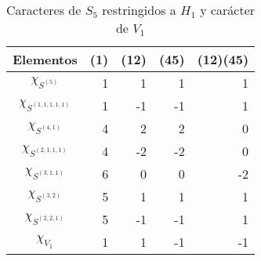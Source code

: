 \documentclass[12pt]{book}
\theoremstyle{definition}
\newcounter{in}
\begin{document}
\begin{table}[!hbtp]
  \centering
  \begin{tabular}{c |r r r r}
    Elementos & (1) & (12) & (45) & (12)(45) \\
    \hline
    $\chi_{S^{(5)}}$ & 1 & 1  & 1  & 1 \\
    $\chi_{S^{(1,1,1,1,1)}}$ & 1 & -1 & -1 & 1  \\
    $\chi_{S^{(4,1)}}$ & 4 & 2  & 2  & 0  \\
    $\chi_{S^{(2,1,1,1)}}$ & 4 & -2 & -2 & 0  \\
    $\chi_{S^{(3,1,1)}}$ & 6 & 0  & 0  & -2 \\
    $\chi_{S^{(3,2)}}$ & 5 & 1  & 1  & 1  \\
    $\chi_{S^{(2,2,1)}}$ & 5 & -1 & -1 & 1  \\
    \hline
    $\chi_{V_{1}}$ & 1 & 1 & -1 & -1 \\
  \end{tabular}

  \caption{Caracteres de $S_{5}$ restringidos a $H_{1}$ y carácter de $V_{1}$}
  \label{tab:clanes-H_1-5}
\end{table}
\end{document}
